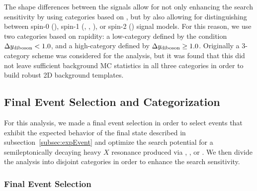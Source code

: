 The shape differences between the \VBF signals allow for not only enhancing the search sensitivity by using categories based on \Dy, but by also allowing for distinguishing between spin-0 (\RadtoWW), spin-1 (\ZprtoWW, \WprtoWZ, \WprtoWH), or spin-2 (\GBulktoWW) \VBF signal models.
For this reason, we use two categories based on rapidity: a low-\Dy category defined by the condition $\Delta y_\mathrm{diboson}<1.0$, and a high-\Dy category defined by $\Delta y_\mathrm{diboson}\geq1.0$.
Originally a 3-category scheme was considered for the analysis, but it was found that this did not leave sufficient background MC statistics in all three categories in order to build robust 2D background templates.

\subsection{Final Event Selection and Categorization}
\label{subsec:eventSelect}

For this analysis, we made a final event selection in order to select events that exhibit the expected behavior of the final state described in subsection~\ref{subsec:expEvent} and optimize the search potential for a semileptonically decaying heavy $X$ resonance produced via \ggF, \DY, or \VBF.
We then divide the analysis into disjoint categories in order to enhance the search sensitivity.

\subsubsection{Final Event Selection}

